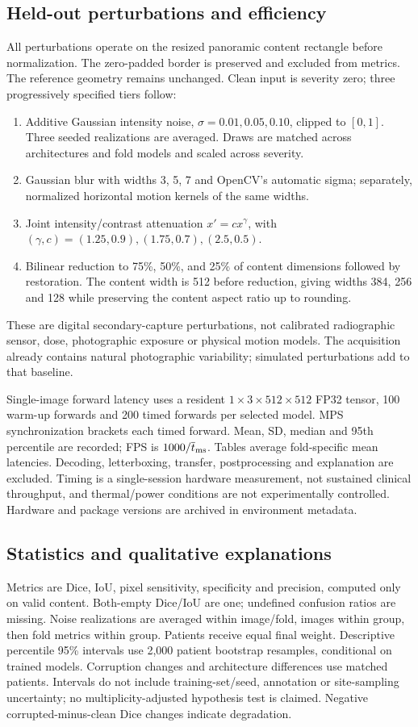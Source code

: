 \documentclass[11pt]{article}
\begin{document}
\subsection{Held-out perturbations and efficiency}
All perturbations operate on the resized panoramic content rectangle before normalization. The zero-padded border is preserved and excluded from metrics. The reference geometry remains unchanged. Clean input is severity zero; three progressively specified tiers follow:
\begin{enumerate}
\item Additive Gaussian intensity noise, $\sigma=0.01,0.05,0.10$, clipped to $[0,1]$. Three seeded realizations are averaged. Draws are matched across architectures and fold models and scaled across severity.
\item Gaussian blur with widths 3, 5, 7 and OpenCV's automatic sigma; separately, normalized horizontal motion kernels of the same widths.
\item Joint intensity/contrast attenuation $x'=cx^\gamma$, with $(\gamma,c)=(1.25,0.9),(1.75,0.7),(2.5,0.5)$.
\item Bilinear reduction to 75\%, 50\%, and 25\% of content dimensions followed by restoration. The content width is 512 before reduction, giving widths 384, 256 and 128 while preserving the content aspect ratio up to rounding.
\end{enumerate}
These are digital secondary-capture perturbations, not calibrated radiographic sensor, dose, photographic exposure or physical motion models. The acquisition already contains natural photographic variability; simulated perturbations add to that baseline.

Single-image forward latency uses a resident $1\times3\times512\times512$ FP32 tensor, 100 warm-up forwards and 200 timed forwards per selected model. MPS synchronization brackets each timed forward. Mean, SD, median and 95th percentile are recorded; FPS is $1000/\overline{t}_{\rm ms}$. Tables average fold-specific mean latencies. Decoding, letterboxing, transfer, postprocessing and explanation are excluded. Timing is a single-session hardware measurement, not sustained clinical throughput, and thermal/power conditions are not experimentally controlled. Hardware and package versions are archived in environment metadata.

\subsection{Statistics and qualitative explanations}
Metrics are Dice, IoU, pixel sensitivity, specificity and precision, computed only on valid content. Both-empty Dice/IoU are one; undefined confusion ratios are missing. Noise realizations are averaged within image/fold, images within group, then fold metrics within group. Patients receive equal final weight. Descriptive percentile 95\% intervals use 2,000 patient bootstrap resamples, conditional on trained models. Corruption changes and architecture differences use matched patients. Intervals do not include training-set/seed, annotation or site-sampling uncertainty; no multiplicity-adjusted hypothesis test is claimed. Negative corrupted-minus-clean Dice changes indicate degradation.
\end{document}
